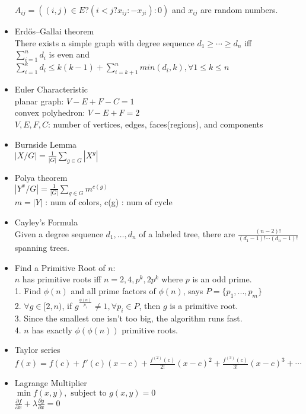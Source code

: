 \begin{itemize}
    $A_{ij}=((i,j)\in E ? (i < j ? x_{ij} : -x_{ji}) : 0)$ and $x_{ij}$ are random numbers.
  \item Erdős–Gallai theorem\\
    There exists a simple graph with degree sequence $d_1\ge\cdots\ge d_n$ iff\\
    $\sum\limits_{i=1}^{n} d_i$ is even and $\sum\limits_{i=1}^{k} d_i\le k(k-1)+\sum\limits_{i=k+1}^{n} min(d_i,k), \forall 1\le k\le n$
  \item Euler Characteristic\\
    planar graph: $V-E+F-C=1$ \\
    convex polyhedron: $V-E+F=2$ \\
    $V,E,F,C$: number of vertices, edges, faces(regions), and components
  \item Burnside Lemma\\
    $|X/G|=\frac{1}{|G|}\sum\limits_{g \in G} {|X^g|}$
  \item Polya theorem\\
    $|Y^x/G|=\frac{1}{|G|}\sum\limits_{g \in G} {m^{c(g)}}$\\
    $m = |Y|$ : num of colors, c(g) : num of cycle
  \item Cayley's Formula\\
    Given a degree sequence $d_1,\dots,d_n$ of a labeled tree, there are $\frac{(n-2)!}{(d_1-1)!\cdots(d_n-1)!}$ spanning trees.
  \item Find a Primitive Root of $n$:\\
    $n$ has primitive roots iff $n=2,4,p^k,2p^k$ where $p$ is an odd prime.\\
    1. Find $\phi(n)$ and all prime factors of $\phi(n)$, says $P=\{p_1,...,p_m\}$\\
    2. $\forall g\in[2,n)$, if $g^{\frac{\phi(n)}{p_i}}\ne 1,\forall p_i\in P$, then $g$ is a primitive root.\\
    3. Since the smallest one isn't too big, the algorithm runs fast.\\
    4. $n$ has exactly $\phi(\phi(n))$ primitive roots.
  \item Taylor series\\
    $f(x) = f(c) + f'(c)(x-c) + \frac{f^{(2)}(c)}{2!}(x-c)^2 + \frac{f^{(3)}(c)}{3!}(x-c)^3 + \cdots$
  \item Lagrange Multiplier\\
    $\min f(x, y), \mbox{ subject to } g(x, y) = 0$\\
    $\frac{\partial f}{\partial x} + \lambda\frac{\partial g}{\partial x}=0$\\

\end{itemize}
